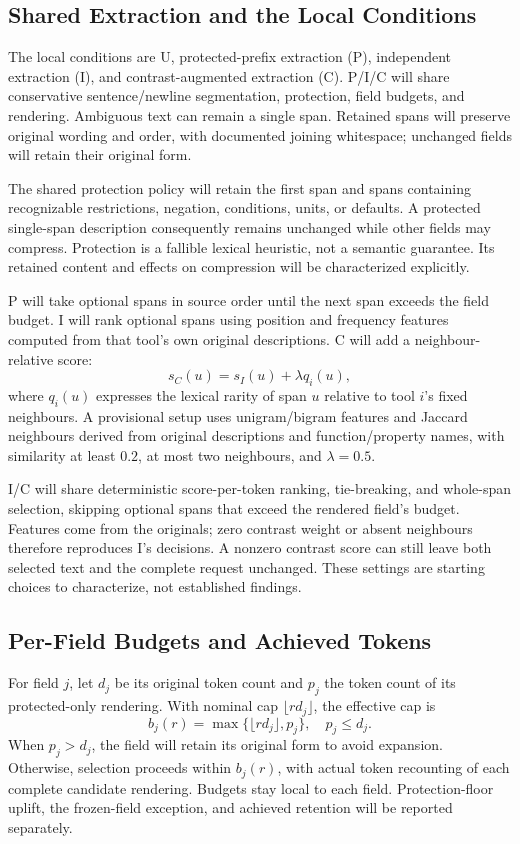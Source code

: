 \documentclass[conference]{IEEEtran}
\begin{document}
\subsection{Shared Extraction and the Local Conditions}
The local conditions are U, protected-prefix extraction (P), independent extraction (I), and contrast-augmented extraction (C). P/I/C will share conservative sentence/newline segmentation, protection, field budgets, and rendering. Ambiguous text can remain a single span. Retained spans will preserve original wording and order, with documented joining whitespace; unchanged fields will retain their original form.

The shared protection policy will retain the first span and spans containing recognizable restrictions, negation, conditions, units, or defaults. A protected single-span description consequently remains unchanged while other fields may compress. Protection is a fallible lexical heuristic, not a semantic guarantee. Its retained content and effects on compression will be characterized explicitly.

P will take optional spans in source order until the next span exceeds the field budget. I will rank optional spans using position and frequency features computed from that tool's own original descriptions. C will add a neighbour-relative score:
\begin{equation}
s_C(u)=s_I(u)+\lambda q_i(u),
\end{equation}
where $q_i(u)$ expresses the lexical rarity of span $u$ relative to tool $i$'s fixed neighbours. A provisional setup uses unigram/bigram features and Jaccard neighbours derived from original descriptions and function/property names, with similarity at least $0.2$, at most two neighbours, and $\lambda=0.5$.

I/C will share deterministic score-per-token ranking, tie-breaking, and whole-span selection, skipping optional spans that exceed the rendered field's budget. Features come from the originals; zero contrast weight or absent neighbours therefore reproduces I's decisions. A nonzero contrast score can still leave both selected text and the complete request unchanged. These settings are starting choices to characterize, not established findings.

\subsection{Per-Field Budgets and Achieved Tokens}
For field $j$, let $d_j$ be its original token count and $p_j$ the token count of its protected-only rendering. With nominal cap $\lfloor r d_j\rfloor$, the effective cap is
\begin{equation}
b_j(r)=\max\{\lfloor r d_j\rfloor,p_j\},\quad p_j\leq d_j.
\end{equation}
When $p_j>d_j$, the field will retain its original form to avoid expansion. Otherwise, selection proceeds within $b_j(r)$, with actual token recounting of each complete candidate rendering. Budgets stay local to each field. Protection-floor uplift, the frozen-field exception, and achieved retention will be reported separately.
\end{document}
